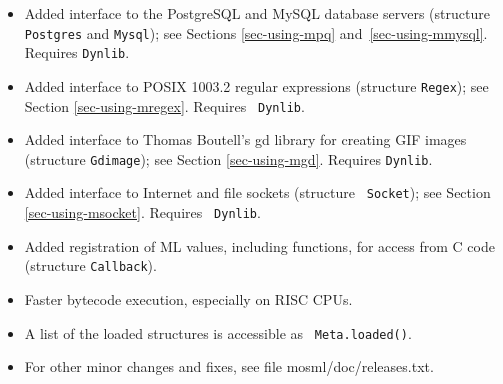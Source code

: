 \documentclass[fleqn]{article}
\begin{document}
\begin{itemize}
\item Added interface to the PostgreSQL and MySQL database servers
  (structure {\tt Postgres} and {\tt Mysql}); see Sections
  \ref{sec-using-mpq} and~\ref{sec-using-mmysql}.  Requires
  {\tt Dynlib}.
  
\item Added interface to POSIX 1003.2 regular expressions (structure
  {\tt Regex}); see Section \ref{sec-using-mregex}.  Requires {\tt
    Dynlib}.
  
\item Added interface to Thomas Boutell's gd library for creating GIF
  images (structure {\tt Gdimage}); see Section \ref{sec-using-mgd}.
  Requires {\tt Dynlib}.
  
\item Added interface to Internet and file sockets (structure {\tt
    Socket}); see Section \ref{sec-using-msocket}. Requires {\tt
    Dynlib}.
  
\item Added registration of ML values, including functions, for access
  from C code (structure \texttt{Callback}).
  
\item Faster bytecode execution, especially on RISC CPUs.
  
\item A list of the loaded structures is accessible as {\tt
    Meta.loaded()}.

\item For other minor changes and fixes, see file
  mosml/doc/releases.txt.
\end{itemize}





\end{document}

